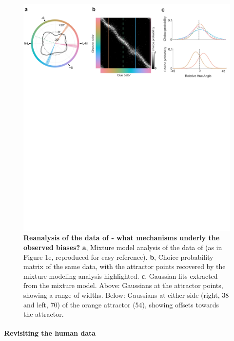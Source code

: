 \documentclass[9pt,biorxiv,lineno,onehalfspacing]{lapreprint}
\begin{document}
\begin{refsection}
\begin{figure}
    \begin{fullwidth}
    \centering
    \includegraphics[width=\textwidth+4cm,trim={0 18cm 0 0},clip]{Outputs/Paper/Figures/flat/F5b_HumanMainText_3.png}
    \caption{\textbf {Reanalysis of the data of \citet{bae_why_2015} - what mechanisms underly the observed biases?}
    \textbf{a}, Mixture model analysis of the data of \citet{bae_why_2015} (as in Figure 1e, reproduced for easy reference).
    \textbf{b}, Choice probability matrix of the same data, with the attractor points recovered by the mixture modeling analysis highlighted.
    \textbf{c}, Gaussian fits extracted from the mixture model. 
    Above: Gaussians at the attractor points, showing a range of widths. 
    Below: Gaussians at either side (right, 38\degree{} and left, 70\degree{}) of the orange attractor (54\degree{}), showing offsets towards the attractor.}
    \label{fig:HumanMainText}
    \end{fullwidth}
\end{figure}

\paragraph{Revisiting the human data}


\end{refsection}
\end{document}
